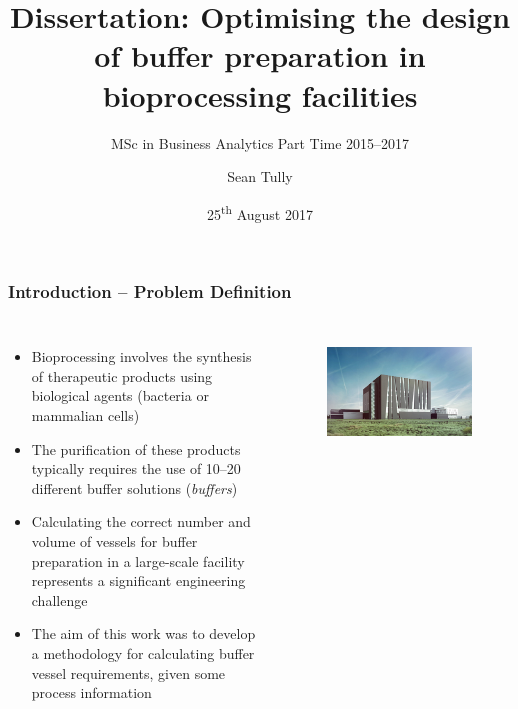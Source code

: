 \documentclass{beamer}
\title[Bioprocessing facilities design]{Dissertation:
    Optimising the design of buffer preparation in bioprocessing facilities}
\subtitle{MSc in Business Analytics Part Time 2015--2017}
\author{Sean Tully}
\institute{University College Dublin}
\date{25\textsuperscript{th} August 2017}
\begin{document}

\begin{frame}
    \titlepage
\end{frame}


\begin{frame}
    \frametitle{Introduction -- Problem Definition}
    \begin{columns}
            \begin{itemize}
                \item Bioprocessing involves the synthesis of therapeutic
                    products using biological agents (bacteria or mammalian
                    cells)        
                \item The purification of these products typically requires the
                    use of 10--20 different buffer solutions (\emph{buffers})
                \item Calculating the correct number and volume of vessels for
                    buffer preparation in a large-scale facility represents a
                    significant engineering challenge
                \item The aim of this work was to develop a methodology for
                    calculating buffer vessel requirements, given some process
                    information
            \end{itemize}        
        \begin{figure}
            \centering
            \includegraphics[angle=0,scale=0.22]{alexion.jpg}\\
            \vspace{0.3cm}

\end{figure}
\end{columns}
\end{frame}
\end{document}
